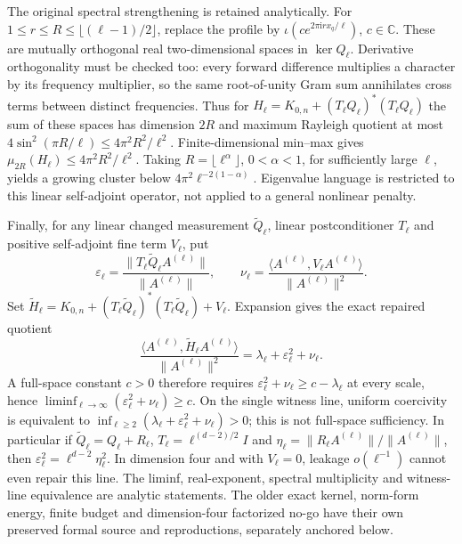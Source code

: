 \documentclass[11pt]{article}
\newcommand{\C}{\mathbb C}
\newcommand{\ip}[2]{\langle #1,#2\rangle}
\begin{document}
The original spectral strengthening is retained analytically. For
$1\leq r\leq R\leq\lfloor(\ell-1)/2\rfloor$, replace the profile by
$\iota(c e^{2\pi\mathrm i r x_q/\ell})$, $c\in\C$. These are mutually
orthogonal real two-dimensional spaces in $\ker Q_\ell$. Derivative
orthogonality must be checked too: every forward difference multiplies a
character by its frequency multiplier, so the same root-of-unity Gram sum
annihilates cross terms between distinct frequencies. Thus for
$H_\ell=K_{0,n}+(T_\ell Q_\ell)^*(T_\ell Q_\ell)$ the sum of these spaces
has dimension $2R$ and maximum Rayleigh quotient at most
$4\sin^2(\pi R/\ell)\leq4\pi^2R^2/\ell^2$. Finite-dimensional min--max
gives $\mu_{2R}(H_\ell)\leq4\pi^2R^2/\ell^2$. Taking
$R=\lfloor\ell^\alpha\rfloor$, $0<\alpha<1$, for sufficiently large
$\ell$, yields a growing cluster below $4\pi^2\ell^{-2(1-\alpha)}$.
Eigenvalue language is restricted to this linear self-adjoint operator,
not applied to a general nonlinear penalty.

Finally, for any linear changed measurement $\widetilde Q_\ell$, linear
postconditioner $T_\ell$ and positive self-adjoint fine term $V_\ell$, put
\[
 \varepsilon_\ell=\frac{\|T_\ell\widetilde Q_\ell A^{(\ell)}\|}
                         {\|A^{(\ell)}\|},\qquad
 \nu_\ell=\frac{\ip{A^{(\ell)}}{V_\ell A^{(\ell)}}}
                    {\|A^{(\ell)}\|^2}.
\]
Set $\widetilde H_\ell=K_{0,n}+
(T_\ell\widetilde Q_\ell)^*(T_\ell\widetilde Q_\ell)+V_\ell$.
Expansion gives the exact repaired quotient
\[
 \frac{\ip{A^{(\ell)}}{\widetilde H_\ell A^{(\ell)}}}
      {\|A^{(\ell)}\|^2}
 =\lambda_\ell+\varepsilon_\ell^2+\nu_\ell.
\]
A full-space constant $c>0$ therefore requires
$\varepsilon_\ell^2+\nu_\ell\geq c-\lambda_\ell$ at every scale, hence
$\liminf_{\ell\to\infty}(\varepsilon_\ell^2+\nu_\ell)\geq c$.
On the single witness line, uniform coercivity is equivalent to
$\inf_{\ell\geq2}(\lambda_\ell+\varepsilon_\ell^2+\nu_\ell)>0$;
this is not full-space sufficiency. In particular if
$\widetilde Q_\ell=Q_\ell+R_\ell$, $T_\ell=\ell^{(d-2)/2}I$ and
$\eta_\ell=\|R_\ell A^{(\ell)}\|/\|A^{(\ell)}\|$, then
$\varepsilon_\ell^2=\ell^{d-2}\eta_\ell^2$. In dimension four and with
$V_\ell=0$, leakage $o(\ell^{-1})$ cannot even repair this line.
The liminf, real-exponent, spectral multiplicity and witness-line equivalence
are analytic statements. The older exact kernel, norm-form energy, finite
budget and dimension-four factorized no-go have their own preserved formal
source and reproductions, separately anchored below.
\end{document}

